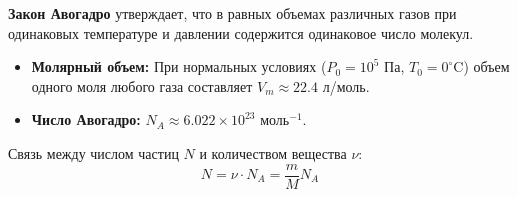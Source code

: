 \textbf{Закон Авогадро} утверждает, что в равных объемах различных газов при одинаковых температуре и давлении содержится одинаковое число молекул.
\begin{itemize}
    \item \textbf{Молярный объем:} При нормальных условиях ($P_0 = 10^5$ Па, $T_0 = 0^\circ$C) объем одного моля любого газа составляет $V_m \approx 22.4$ л/моль.
    \item \textbf{Число Авогадро:} $N_A \approx 6.022 \times 10^{23}$ моль$^{-1}$.
\end{itemize}
Связь между числом частиц $N$ и количеством вещества $\nu$:
\[
N = \nu \cdot N_A = \frac{m}{M} N_A
\]